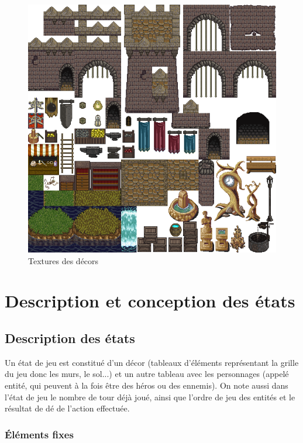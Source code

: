 \documentclass[a4paper,12pt]{article}
\begin{document}
\begin{figure}[hbt!]
    \centering
    \includegraphics[scale=1.5, angle=0]{images/texture_decor1.png}
    \caption{Textures des décors}
    \label{fig:textDecor}
\end{figure}


\clearpage
\section{Description et conception des états}

\subsection{Description des états}
Un état de jeu est constitué d'un décor (tableaux d'éléments représentant la grille du jeu donc les murs, le sol...) et un autre tableau avec les personnages (appelé entité, qui peuvent à la fois être des héros ou des ennemis). On note aussi dans l'état de jeu le nombre de tour déjà joué, ainsi que l'ordre de jeu des entités et le résultat de dé de l'action effectuée.

\subsubsection{Éléments fixes}
\end{document}
